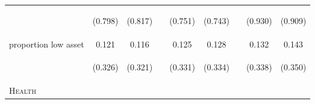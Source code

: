 \documentclass{article}[11pt,subeqn]
\begin{document}
\begin{spacing}{1.5}
\begin{table}[ht]
\begin{center}
\begin{tabular}{lccp{5mm}ccp{5mm}cc}
\begin{footnotesize}\end{footnotesize}	& \begin{footnotesize} (0.798)\end{footnotesize} & \begin{footnotesize} (0.817)\end{footnotesize} & \begin{footnotesize} 	\end{footnotesize} & \begin{footnotesize} (0.751)\end{footnotesize} & \begin{footnotesize} (0.743)\end{footnotesize} & \begin{footnotesize} 	\end{footnotesize} & \begin{footnotesize} (0.930)\end{footnotesize} & \begin{footnotesize} (0.909)\end{footnotesize}	\\
proportion low asset	&	0.121	&	0.116	&	&	0.125	&	0.128	&	&	0.132	&	0.143		\\
\begin{footnotesize}\end{footnotesize}	& \begin{footnotesize} (0.326)\end{footnotesize} & \begin{footnotesize} (0.321)\end{footnotesize} & \begin{footnotesize} 	\end{footnotesize} & \begin{footnotesize} (0.331)\end{footnotesize} & \begin{footnotesize} (0.334)\end{footnotesize} & \begin{footnotesize} 	\end{footnotesize} & \begin{footnotesize} (0.338)\end{footnotesize} & \begin{footnotesize} (0.350)\end{footnotesize}	\\
\textsc{Health} & & &&&&&& \\															

\end{tabular}
\end{center}
\end{table}
\end{spacing}
\end{document}
